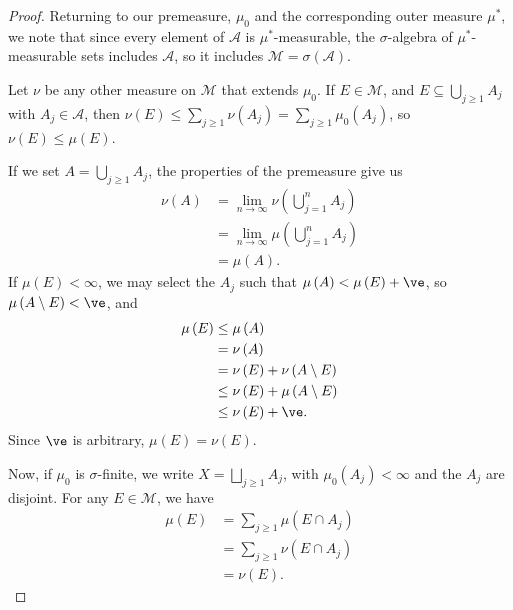 \documentclass[10pt]{mypackage}
\begin{document}
\begin{proof}
  Returning to our premeasure, $\mu_0$ and the corresponding outer measure $\mu^{\ast}$, we note that since every element of $\mathcal{A}$ is $\mu^{\ast}$-measurable, the $\sigma$-algebra of $\mu^{\ast}$-measurable sets includes $\mathcal{A}$, so it includes $\mathcal{M} = \sigma\left( \mathcal{A} \right)$.\newline

  Let $\nu$ be any other measure on $\mathcal{M}$ that extends $\mu_0$. If $E\in \mathcal{M}$, and $E\subseteq \bigcup_{j\geq 1}A_j$ with $A_j\in \mathcal{A}$, then $\nu\left( E \right) \leq \sum_{j\geq 1}\nu\left( A_j \right) = \sum_{j\geq 1}\mu_0\left( A_j \right)$, so $\nu\left( E \right)\leq \mu\left( E \right)$.\newline

  If we set $A = \bigcup_{j\geq 1}A_j$, the properties of the premeasure give us
  \begin{align*}
    \nu\left( A  \right) &= \lim_{n\rightarrow\infty} \nu\left( \bigcup_{j=1}^{n} A_j \right)\\
                         &= \lim_{n\rightarrow\infty} \mu\left( \bigcup_{j=1}^{n}A_j \right)\\
                         &= \mu\left( A \right).
  \end{align*}
  If $\mu\left( E \right) < \infty$, we may select the $A_j$ such that $\mu\left( A \right) < \mu\left( E \right) + \ve$, so $\mu\left( A\setminus E \right) < \ve$, and
  \begin{align*}
    \mu\left( E \right) &\leq \mu\left( A \right)\\
                        &= \nu\left( A \right)\\
                        &= \nu\left( E \right)  + \nu\left( A\setminus E \right)\\
                        &\leq \nu\left( E \right) +\mu\left( A\setminus E \right)\\
                        &\leq \nu\left( E \right) + \ve.
  \end{align*}
  Since $\ve$ is arbitrary, $\mu\left( E \right) = \nu\left( E \right)$.\newline

  Now, if $\mu_0$ is $\sigma$-finite, we write $X = \bigsqcup_{j\geq 1}A_j$, with $\mu_0\left( A_j \right) < \infty$ and the $A_j$ are disjoint. For any $E\in \mathcal{M}$, we have
  \begin{align*}
    \mu\left( E \right) &= \sum_{j\geq 1}\mu\left( E\cap A_j \right)\\
                        &= \sum_{j\geq 1}\nu\left( E\cap A_j \right)\\
                        &= \nu\left( E \right).
  \end{align*}
\end{proof}
\end{document}
